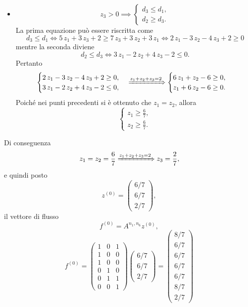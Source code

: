 \begin{alphaparts}
\begin{itemize}
    \item \[z_3 > 0 \implies \begin{cases} d_3 \le d_1, \\ d_2 \ge d_3. \end{cases} \]
     La prima equazione può essere riscritta come
    \[d_3 \le d_1 \Leftrightarrow 5\,z_1+3\,z_3 +2 \ge 7\,z_3+3\,z_2 +3\,z_1 \Leftrightarrow 
    2\,z_1-3\,z_2-4\,z_3+2\ge 0 \]
    mentre la seconda diviene
    \[d_2 \le d_3 \Leftrightarrow 3\,z_1 -2\,z_2 +4\,z_3 -2 \le 0.\]
    Pertanto
    \[ \begin{cases} 2\,z_1-3\,z_2-4\,z_3+2\ge 0, \\ 3\,z_1 -2\,z_2 +4\,z_3 -2 \le 0, \end{cases} \xRightarrow[]{z_1+ z_2 + z_3= 2} \begin{cases} 6\,z_1+z_2-6\ge 0, \\ z_1+6\,z_2-6\ge 0. \end{cases} \]
    Poiché nei punti precedenti si è ottenuto che \(z_1 = z_2\), allora
    \[ \begin{cases} z_1 \ge \frac{6}{7}, \\ z_2 \ge \frac{6}{7}. \end{cases}\]
    \end{itemize}
    Di conseguenza
    \[z_1 = z_2 = \frac{6}{7} \xRightarrow[]{z_1+ z_2 + z_3= 2} z_3 = \frac{2}{7},\]
    e quindi posto 
    \[ z^{(0)} = \begin{pmatrix}
       6/7  \\ 6/7 \\ 2/7
    \end{pmatrix},\]
    il vettore di flusso 
    \[ f^{(0)} = A^{n_1,n_6}z^{(0)},\]
    \[ f^{(0)} = \begin{pmatrix}
        1 & 0 & 1\\
        1 & 0 & 0\\
        1 & 0 & 0\\
        0 & 1 & 0\\
        0 & 1 & 1\\
        0 & 0 & 1
    \end{pmatrix} \begin{pmatrix} 6/7  \\ 6/7 \\ 2/7 \end{pmatrix}
     = \begin{pmatrix}
        8/7 \\ 6/7 \\ 6/7 \\ 6/7 \\ 6/7 \\ 8/7 \\ 2/7

\end{pmatrix}\]
\end{alphaparts}
